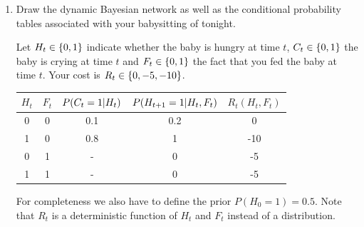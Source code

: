 \documentclass[11pt, a4paper]{article}
\begin{document}
\begin{enumerate}
    \item Draw the dynamic Bayesian network as well as the conditional probability tables associated with your babysitting of tonight.
    
    \begin{solution}
        Let $H_t \in \{0, 1\}$ indicate whether the baby is hungry at time $t$, $C_t \in \{0, 1\}$ the baby is crying at time $t$ and $F_t \in \{0, 1\}$ the fact that you fed the baby at time $t$. Your cost is $R_t \in \{0, -5, -10\}$.
        
        \begin{center}
        \end{center}
        
        \begin{table}[h]
            \centering
            \begin{tabular}{cc|cc|c}
                \toprule
                $H_t$ & $F_t$ & $P(C_t = 1 \vert H_t)$ & $P(H_{t+1} = 1 \vert H_t, F_t)$ & $R_t(H_t, F_t)$ \\
                \midrule
                0 & 0 & 0.1 & 0.2 & 0 \\
                1 & 0 & 0.8 & 1 & -10 \\
                0 & 1 & -  & 0 & -5 \\
                1 & 1 & -  & 0 & -5 \\
                \bottomrule
            \end{tabular}
        \end{table}
        
        For completeness we also have to define the prior $P(H_0 = 1) = 0.5$. Note that $R_t$ is a deterministic function of $H_t$ and $F_t$ instead of a distribution.
    \end{solution}
    

\end{enumerate}
\end{document}
